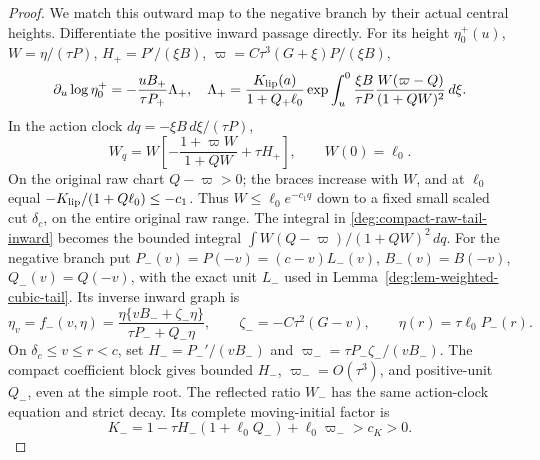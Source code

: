 \begin{proof}
We match this outward map to the negative branch by their actual central
heights. Differentiate the positive inward passage directly. For its height
\(\eta_0^+(u)\), \(W=\eta/(\tau P)\),
\(H_+=P'/(\xi B)\), \(\varpi=C\tau^3(G+\xi)P/(\xi B)\),
\begin{equation}\label{deg:compact-raw-tail-inward}
 \partial_u\log\eta_0^+=-\frac{uB_+}{\tau P_+}\Lambda_+,
 \quad\Lambda_+=\frac{K_{\rm lip}(a)}{1+Q_+\ell_0}
       \exp\int_u^0\frac{\xi B}{\tau P}
                         \frac{W(\varpi-Q)}{(1+QW)^2}\,d\xi.
\end{equation}
In the action clock \(dq=-\xi B\,d\xi/(\tau P)\),
\[
 W_q=W\left[-\frac{1+\varpi W}{1+QW}+\tau H_+\right],\qquad W(0)=\ell_0.
\]
On the original raw chart \(Q-\varpi>0\); the braces increase with
\(W\), and at \(\ell_0\) equal
\(-K_{\rm lip}/(1+Q\ell_0)\le-c_1\). Thus
\(W\le\ell_0e^{-c_1q}\) down to a fixed small scaled cut
\(\delta_c\), on the entire original raw range. The integral in
\eqref{deg:compact-raw-tail-inward} becomes the bounded integral
\(\int W(Q-\varpi)/(1+QW)^2\,dq\).
For the negative branch put \(P_-(v)=P(-v)=(c-v)L_-(v)\),
\(B_-(v)=B(-v)\), \(Q_-(v)=Q(-v)\), with
the exact unit \(L_-\) used in
Lemma~\ref{deg:lem-weighted-cubic-tail}. Its inverse inward graph is
\[
 \eta_v=f_-(v,\eta)
 =\frac{\eta\{vB_-+\zeta_-\eta\}}{\tau P_-+Q_-\eta},\qquad
 \zeta_-=-C\tau^2(G-v),\qquad
 \eta(r)=\tau\ell_0P_-(r).
\]
On \(\delta_c\le v\le r<c\), set
\(H_-=P_-'/ (vB_-)\) and
\(\varpi_-=\tau P_-\zeta_-/(vB_-)\).
The compact coefficient block gives bounded \(H_-\),
\(\varpi_-=O(\tau^3)\), and positive-unit \(Q_-\), even at
the simple root. The reflected ratio \(W_-\) has the same action-clock
equation and strict decay. Its complete moving-initial factor is
\[
 K_-=1-\tau H_-(1+\ell_0Q_-)+\ell_0\varpi_->c_K>0.
\]


\end{proof}
